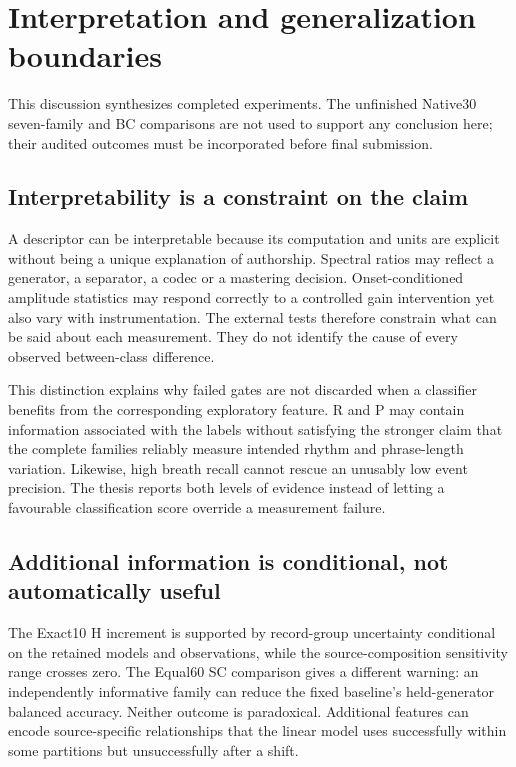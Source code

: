 \section{Interpretation and generalization boundaries}
\label{sec:discussion}

This discussion synthesizes completed experiments. The unfinished Native30
seven-family and BC comparisons are not used to support any conclusion here;
their audited outcomes must be incorporated before final submission.

\subsection{Interpretability is a constraint on the claim}
A descriptor can be interpretable because its computation and units are
explicit without being a unique explanation of authorship. Spectral ratios
may reflect a generator, a separator, a codec or a mastering decision.
Onset-conditioned amplitude statistics may respond correctly to a controlled
gain intervention yet also vary with instrumentation. The external tests
therefore constrain what can be said about each measurement. They do not
identify the cause of every observed between-class difference.

This distinction explains why failed gates are not discarded when a
classifier benefits from the corresponding exploratory feature. R and P
may contain information associated with the labels without satisfying the
stronger claim that the complete families reliably measure intended rhythm
and phrase-length variation. Likewise, high breath recall cannot rescue
an unusably low event precision. The thesis reports both levels of evidence
instead of letting a favourable classification score override a measurement
failure.

\subsection{Additional information is conditional, not automatically useful}
The Exact10 H increment is supported by record-group uncertainty conditional
on the retained models and observations, while the source-composition
sensitivity range crosses zero. The Equal60 SC comparison gives a different
warning: an independently informative family can reduce the fixed baseline's
held-generator balanced accuracy. Neither outcome is paradoxical. Additional
features can encode source-specific relationships that the linear model
uses successfully within some partitions but unsuccessfully after a shift.


